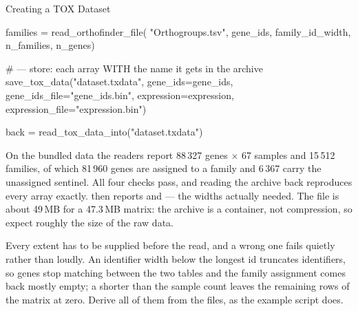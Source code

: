 \begin{recipe}[label=sub:tox-dataset]{Creating a TOX Dataset}
\begin{codefragment}[language=Python,caption={Fragments to edit: the files, their shape, and what you store}]
families = read_orthofinder_file(
    "Orthogroups.tsv", gene_ids, family_id_width,
    n_families, n_genes)

# --- store: each array WITH the name it gets in the archive
save_tox_data("dataset.txdata",
    gene_ids=gene_ids,   gene_ids_file="gene_ids.bin",
    expression=expression, expression_file="expression.bin")

back = read_tox_data_into("dataset.txdata")
\end{codefragment}

\begin{parameters}
\end{parameters}

\begin{expectedresults}
  On the bundled data the readers report 88\,327 genes $\times$ 67 samples and
  15\,512 families, of which 81\,960 genes are assigned to a family and 6\,367
  carry the unassigned sentinel. All four checks pass, and reading the archive
  back reproduces every array exactly.  then reports
   and  --- the widths actually
  needed. The file is about 49\,MB for a 47.3\,MB matrix: the archive is a
  container, not compression, so expect roughly the size of the raw data.
\end{expectedresults}

\begin{pitfall}
  Every extent has to be supplied before the read, and a wrong one fails
  quietly rather than loudly. An identifier width below the longest id
  truncates identifiers, so genes stop matching between the two tables and the
  family assignment comes back mostly empty; a  shorter than
  the sample count leaves the remaining rows of the matrix at zero. Derive all
  of them from the files, as the example script does.
\end{pitfall}


\end{recipe}
